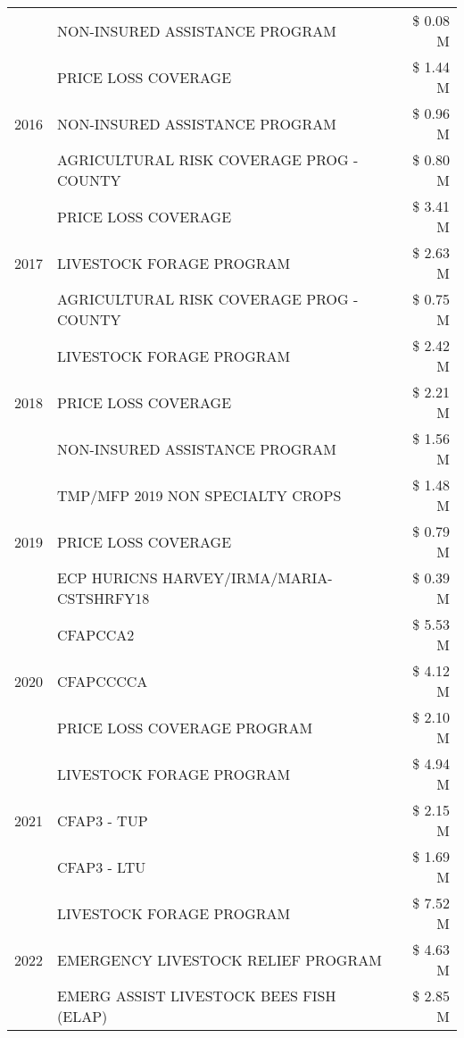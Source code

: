 \begin{tabular}{llr}
 & NON-INSURED ASSISTANCE PROGRAM & \$ 0.08 M \\
\cline{1-3}
\multirow[t]{3}{*}{2016} & PRICE LOSS COVERAGE & \$ 1.44 M \\
 & NON-INSURED ASSISTANCE PROGRAM & \$ 0.96 M \\
 & AGRICULTURAL RISK COVERAGE PROG - COUNTY & \$ 0.80 M \\
\cline{1-3}
\multirow[t]{3}{*}{2017} & PRICE LOSS COVERAGE & \$ 3.41 M \\
 & LIVESTOCK FORAGE PROGRAM & \$ 2.63 M \\
 & AGRICULTURAL RISK COVERAGE PROG - COUNTY & \$ 0.75 M \\
\cline{1-3}
\multirow[t]{3}{*}{2018} & LIVESTOCK FORAGE PROGRAM & \$ 2.42 M \\
 & PRICE LOSS COVERAGE & \$ 2.21 M \\
 & NON-INSURED ASSISTANCE PROGRAM & \$ 1.56 M \\
\cline{1-3}
\multirow[t]{3}{*}{2019} & TMP/MFP 2019 NON SPECIALTY CROPS & \$ 1.48 M \\
 & PRICE LOSS COVERAGE & \$ 0.79 M \\
 & ECP HURICNS HARVEY/IRMA/MARIA-CSTSHRFY18 & \$ 0.39 M \\
\cline{1-3}
\multirow[t]{3}{*}{2020} & CFAPCCA2 & \$ 5.53 M \\
 & CFAPCCCCA & \$ 4.12 M \\
 & PRICE LOSS COVERAGE PROGRAM & \$ 2.10 M \\
\cline{1-3}
\multirow[t]{3}{*}{2021} & LIVESTOCK FORAGE PROGRAM & \$ 4.94 M \\
 & CFAP3 - TUP & \$ 2.15 M \\
 & CFAP3 - LTU & \$ 1.69 M \\
\cline{1-3}
\multirow[t]{3}{*}{2022} & LIVESTOCK FORAGE PROGRAM & \$ 7.52 M \\
 & EMERGENCY LIVESTOCK RELIEF PROGRAM & \$ 4.63 M \\
 & EMERG ASSIST LIVESTOCK BEES FISH (ELAP) & \$ 2.85 M \\
\cline{1-3}
\bottomrule
\end{tabular}
